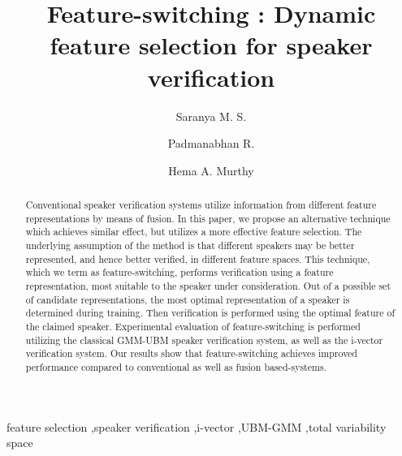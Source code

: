 \documentclass[preprint,12pt,5p]{elsarticle}
\begin{document}
\sloppy
\flushend

\begin{frontmatter}

\title{ {\bf Feature-switching : Dynamic feature selection for speaker verification}}

\author[label1]{Saranya M. S.}
\address[label1]{Indian Institute of Technology Madras}


\author[label2]{Padmanabhan R.}
\address[label2]{Indian Institute of Technology Mandi}

\author[label1]{Hema A. Murthy}

\begin{abstract}
Conventional speaker verification systems utilize information from different
feature representations by means of fusion. In this paper, we propose an
alternative technique which achieves similar effect, but 
utilizes a more effective feature selection. The underlying assumption of the 
method is that different speakers may be better represented, and hence better 
verified, in different feature spaces.  This technique, which we term as feature-switching, 
performs verification using a feature representation, most suitable to the
speaker under consideration. %
Out of a possible set of candidate representations, the most optimal
representation of a speaker is determined during training. Then verification is
performed using the optimal feature of the claimed speaker. Experimental evaluation
of feature-switching is performed utilizing the classical GMM-UBM speaker
verification system, as well as the i-vector verification system. Our results show
that feature-switching achieves improved performance compared to conventional as well
as fusion based-systems.
\end{abstract}

\begin{keyword}
feature selection  \sep speaker verification \sep i-vector \sep UBM-GMM \sep total variability space 
\end{keyword}

\end{frontmatter}
\end{document}
